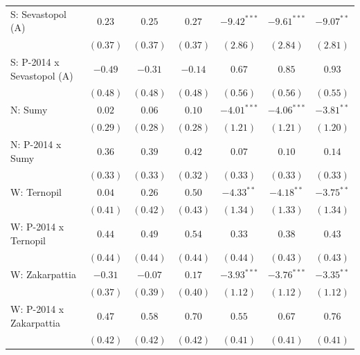 \begin{table}
\begin{center}
\begin{small}
\begin{tabular}{l c c c c c c}
S: Sevastopol (A)           & $0.23$        & $0.25$        & $0.27$         & $-9.42^{***}$ & $-9.61^{***}$ & $-9.07^{**}$  \\
                            & $(0.37)$      & $(0.37)$      & $(0.37)$       & $(2.86)$      & $(2.84)$      & $(2.81)$      \\
S: P-2014 x Sevastopol (A)  & $-0.49$       & $-0.31$       & $-0.14$        & $0.67$        & $0.85$        & $0.93$        \\
                            & $(0.48)$      & $(0.48)$      & $(0.48)$       & $(0.56)$      & $(0.56)$      & $(0.55)$      \\
N: Sumy                     & $0.02$        & $0.06$        & $0.10$         & $-4.01^{***}$ & $-4.06^{***}$ & $-3.81^{**}$  \\
                            & $(0.29)$      & $(0.28)$      & $(0.28)$       & $(1.21)$      & $(1.21)$      & $(1.20)$      \\
N: P-2014 x Sumy            & $0.36$        & $0.39$        & $0.42$         & $0.07$        & $0.10$        & $0.14$        \\
                            & $(0.33)$      & $(0.33)$      & $(0.32)$       & $(0.33)$      & $(0.33)$      & $(0.33)$      \\
W: Ternopil                 & $0.04$        & $0.26$        & $0.50$         & $-4.33^{**}$  & $-4.18^{**}$  & $-3.75^{**}$  \\
                            & $(0.41)$      & $(0.42)$      & $(0.43)$       & $(1.34)$      & $(1.33)$      & $(1.34)$      \\
W: P-2014 x Ternopil        & $0.44$        & $0.49$        & $0.54$         & $0.33$        & $0.38$        & $0.43$        \\
                            & $(0.44)$      & $(0.44)$      & $(0.44)$       & $(0.44)$      & $(0.43)$      & $(0.43)$      \\
W: Zakarpattia              & $-0.31$       & $-0.07$       & $0.17$         & $-3.93^{***}$ & $-3.76^{***}$ & $-3.35^{**}$  \\
                            & $(0.37)$      & $(0.39)$      & $(0.40)$       & $(1.12)$      & $(1.12)$      & $(1.12)$      \\
W: P-2014 x Zakarpattia     & $0.47$        & $0.58$        & $0.70$         & $0.55$        & $0.67$        & $0.76$        \\
                            & $(0.42)$      & $(0.42)$      & $(0.42)$       & $(0.41)$      & $(0.41)$      & $(0.41)$      \\

\end{tabular}
\end{small}
\end{center}
\end{table}
